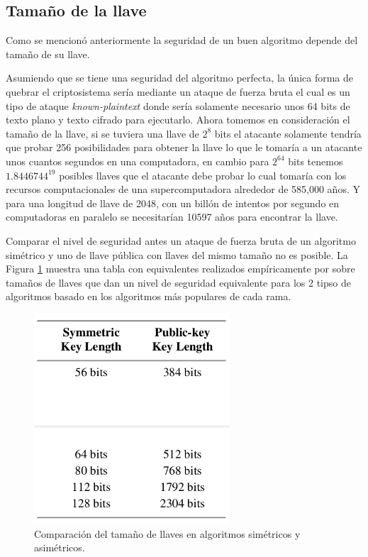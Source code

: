 \subsection{Tamaño de la llave}
Como se mencionó anteriormente la seguridad de un buen algoritmo depende del tamaño de su llave. 

Asumiendo que se tiene una seguridad del algoritmo perfecta, la única forma de quebrar el criptosistema sería mediante un ataque de fuerza bruta el cual es un tipo de ataque \textit{known-plaintext} donde sería solamente necesario unos 64 bits de texto plano y texto cifrado para ejecutarlo. Ahora tomemos en consideración el tamaño de la llave, si se tuviera una llave de $2^8$ bits el atacante solamente tendría que probar 256 posibilidades para obtener la llave lo que le tomaría a un atacante unos cuantos segundos en una computadora, en cambio para $2^{64}$ bits tenemos $1.8446744^{19}$ posibles llaves que el atacante debe probar lo cual tomaría con los recursos computacionales de una supercomputadora alrededor de 585,000 años. Y para una longitud de llave de 2048, con un billón de intentos por segundo en computadoras en paralelo se necesitarían  10597 años para encontrar la llave.

Comparar el nivel de seguridad antes un ataque de fuerza bruta de un algoritmo simétrico y uno de llave pública con llaves del mismo tamaño no es posible. La Figura \ref{figVariacionLlaves} muestra una tabla con equivalentes realizados empíricamente por \cite{bruce} sobre tamaños de llaves que dan un nivel de seguridad equivalente para los 2 tipso de algoritmos basado en los algoritmos más populares de cada rama.

\begin{figure}
	\centering
	\includegraphics[width=0.65\textwidth]{./images/figVariacionLlaves}
	\caption{Comparación del tamaño de llaves en algoritmos simétricos y asimétricos.}
	\label{figVariacionLlaves}
\end{figure}

